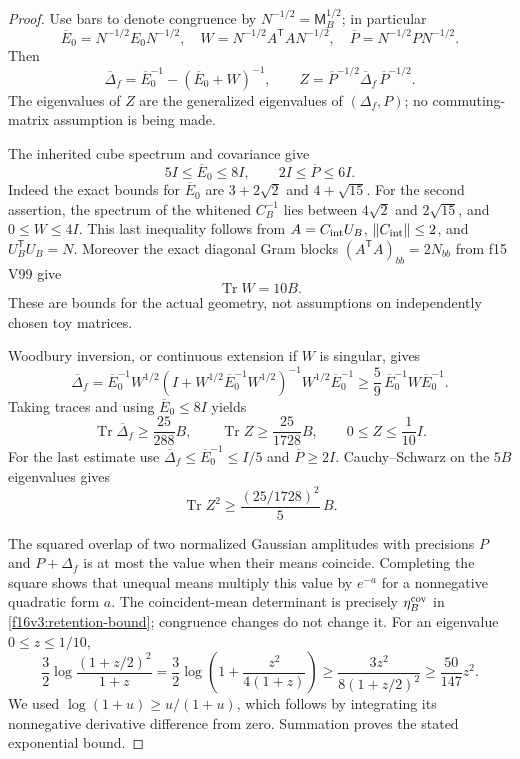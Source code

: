\documentclass[11pt,oneside]{article}
\DeclareMathOperator{\Tr}{Tr}
\begin{document}
\begin{proof}
Use bars to denote congruence by \(N^{-1/2}=\mathsf M_B^{1/2}\);
in particular
\[
 \overline E_0=N^{-1/2}E_0N^{-1/2},\quad
 W=N^{-1/2}A^{\mathsf T}AN^{-1/2},\quad
 \overline P=N^{-1/2}PN^{-1/2}.
\]
Then
\[
 \overline\Delta_f
   =\overline E_0^{-1}-(\overline E_0+W)^{-1},\qquad
 Z=\overline P^{-1/2}\overline\Delta_f\,\overline P^{-1/2}.
\]
The eigenvalues of \(Z\) are the generalized eigenvalues of
\((\Delta_f,P)\); no commuting-matrix assumption is being made.

The inherited cube spectrum and covariance give
\[
 5I\le\overline E_0\le8I,\qquad 2I\le\overline P\le6I.
\]
Indeed the exact bounds for \(\overline E_0\) are
\(3+2\sqrt2\) and \(4+\sqrt{15}\).
For the second assertion, the spectrum of the whitened
\(C_B^{-1}\) lies between \(4\sqrt2\) and \(2\sqrt{15}\), and
\(0\le W\le4I\).
This last inequality follows from
\(A=C_{\rm int}U_B\), \(\|C_{\rm int}\|\le2\), and
\(U_B^{\mathsf T}U_B=N\).
Moreover the exact diagonal Gram blocks
\((A^{\mathsf T}A)_{bb}=2N_{bb}\) from f15 V99 give
\[
                           \Tr W=10B.
\]
These are bounds for the actual geometry, not assumptions
on independently chosen toy matrices.

Woodbury inversion, or continuous extension if \(W\) is singular,
gives
\[
 \overline\Delta_f
 =\overline E_0^{-1}W^{1/2}
   (I+W^{1/2}\overline E_0^{-1}W^{1/2})^{-1}
                       W^{1/2}\overline E_0^{-1}
 \ge\frac59\,\overline E_0^{-1}W\overline E_0^{-1}.
\]
Taking traces and using \(\overline E_0\le8I\) yields
\[
 \Tr\overline\Delta_f\ge\frac{25}{288}B,\qquad
 \Tr Z\ge\frac{25}{1728}B,\qquad 0\le Z\le\frac1{10}I.
\]
For the last estimate use
\(\overline\Delta_f\le\overline E_0^{-1}\le I/5\) and
\(\overline P\ge2I\).
Cauchy--Schwarz on the \(5B\) eigenvalues gives
\[
                   \Tr Z^2\ge\frac{(25/1728)^2}{5}\,B.
\]

The squared overlap of two normalized Gaussian amplitudes with
precisions \(P\) and \(P+\Delta_f\) is at most the value when
their means coincide. Completing the square shows that unequal
means multiply this value by \(e^{-a}\) for a nonnegative
quadratic form \(a\). The coincident-mean determinant is precisely
\(\eta_B^{\rm cov}\) in \eqref{f16v3:retention-bound}; congruence changes
do not change it. For an eigenvalue \(0\le z\le1/10\),
\[
 \frac32\log\frac{(1+z/2)^2}{1+z}
 =\frac32\log\left(1+\frac{z^2}{4(1+z)}\right)
 \ge\frac{3z^2}{8(1+z/2)^2}
 \ge\frac{50}{147}z^2 .
\]
We used \(\log(1+u)\ge u/(1+u)\), which follows by integrating
its nonnegative derivative difference from zero.
Summation proves the stated exponential bound.
\end{proof}
\end{document}
